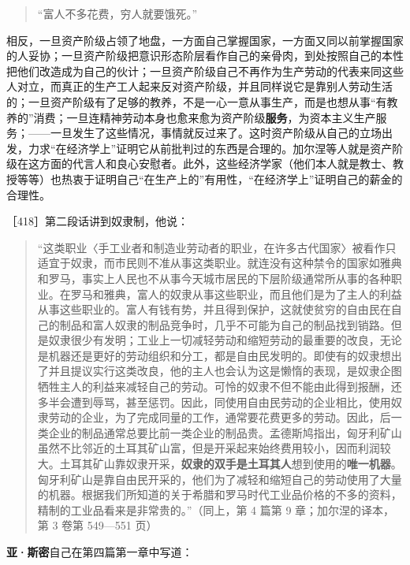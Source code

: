 \begin{quote}“富人不多花费，穷人就要饿死。”\end{quote}

相反，一旦资产阶级占领了地盘，一方面自己掌握国家，一方面又同以前掌握国家的人妥协；一旦资产阶级把意识形态阶层看作自己的亲骨肉，到处按照自己的本性把他们改造成为自己的伙计；一旦资产阶级自己不再作为生产劳动的代表来同这些人对立，而真正的生产工人起来反对资产阶级，并且同样说它是靠别人劳动生活的；一旦资产阶级有了足够的教养，不是一心一意从事生产，而是也想从事“有教养的”消费；一旦连精神劳动本身也愈来愈为资产阶级\textbf{服务}，为资本主义生产服务；——一旦发生了这些情况，事情就反过来了。这时资产阶级从自己的立场出发，力求“在经济学上”证明它从前批判过的东西是合理的。加尔涅等人就是资产阶级在这方面的代言人和良心安慰者。此外，这些经济学家（他们本人就是教士、教授等等）也热衷于证明自己“在生产上的”有用性，“在经济学上”证明自己的薪金的合理性。

［418］第二段话讲到奴隶制，他说：

\begin{quote}“这类职业〈手工业者和制造业劳动者的职业，在许多古代国家〉被看作只适宜于奴隶，而市民则不准从事这类职业。就连没有这种禁令的国家如雅典和罗马，事实上人民也不从事今天城市居民的下层阶级通常所从事的各种职业。在罗马和雅典，富人的奴隶从事这些职业，而且他们是为了主人的利益从事这些职业的。富人有钱有势，并且得到保护，这就使贫穷的自由民在自己的制品和富人奴隶的制品竞争时，几乎不可能为自己的制品找到销路。但是奴隶很少有发明；工业上一切减轻劳动和缩短劳动的最重要的改良，无论是机器还是更好的劳动组织和分工，都是自由民发明的。即使有的奴隶想出了并且提议实行这类改良，他的主人也会认为这是懒惰的表现，是奴隶企图牺牲主人的利益来减轻自己的劳动。可怜的奴隶不但不能由此得到报酬，还多半会遭到辱骂，甚至惩罚。因此，同使用自由民劳动的企业相比，使用奴隶劳动的企业，为了完成同量的工作，通常要花费更多的劳动。因此，后一类企业的制品通常总要比前一类企业的制品贵。孟德斯鸠指出，匈牙利矿山虽然不比邻近的土耳其矿山富，但是开采起来始终费用较小，因而利润较大。土耳其矿山靠奴隶开采，\textbf{奴隶的双手是土耳其人}想到使用的\textbf{唯一机器}。匈牙利矿山是靠自由民开采的，他们为了减轻和缩短自己的劳动使用了大量的机器。根据我们所知道的关于希腊和罗马时代工业品价格的不多的资料，精制的工业品看来是非常贵的。”（同上，第 4 篇第 9 章；加尔涅的译本，第 3 卷第 549—551 页）\end{quote}


\textbf{亚·斯密}自己在第四篇第一章中写道：

